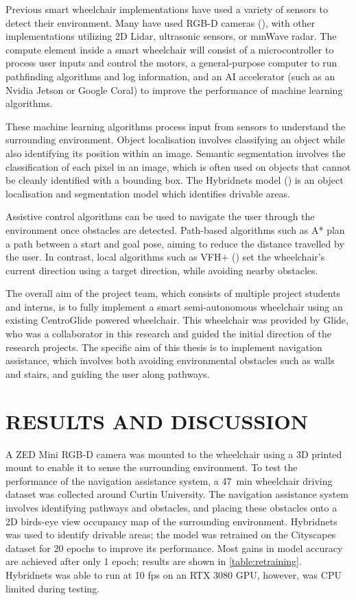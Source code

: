 \documentclass[10pt,twoside]{article}
\begin{document}
Previous smart wheelchair implementations have used a variety of sensors to detect their environment.
Many have used RGB-D cameras (\cite{wangS2P2SelfSupervisedGoalDirected2021}), with other implementations
utilizing 2D Lidar, ultrasonic sensors, or mmWave radar.
The compute element inside a smart wheelchair will consist of a microcontroller to process user inputs and control the motors,
a general-purpose computer to run pathfinding algorithms and log information, and an AI accelerator (such as an Nvidia Jetson or Google Coral)
to improve the performance of machine learning algorithms.

These machine learning algorithms process input from sensors to understand the surrounding environment.
Object localisation involves classifying an object while also identifying its position within an image.
Semantic segmentation involves the classification of each pixel in an image, which is often used
on objects that cannot be cleanly identified with a bounding box.
The Hybridnets model (\cite{vuHybridNetsEndtoEndPerception2022}) is an object localisation and
segmentation model which identifies drivable areas.

Assistive control algorithms can be used to navigate the user through the environment once obstacles are detected.
Path-based algorithms such as A*
plan a path between a start and goal pose, aiming to reduce the distance travelled by the user.
In contrast, local algorithms such as VFH+ (\cite{ulrichVFHReliableObstacle1998})
set the wheelchair's current direction using a target direction, while avoiding nearby obstacles.

The overall aim of the project team, which consists of multiple project students and interns,
is to fully implement a smart semi-autonomous wheelchair
using an existing CentroGlide powered wheelchair. This wheelchair was provided
by Glide, who was a collaborator in this research and guided the initial direction of the
research projects.
The specific aim of this thesis is to implement navigation assistance,
which involves both avoiding environmental obstacles such as walls and stairs,
and guiding the user along pathways.

\section*{\textbf{RESULTS AND DISCUSSION}} %
A ZED Mini RGB-D camera was mounted to the wheelchair using a 3D printed mount to enable it to
sense the surrounding environment. To test the performance of the navigation
assistance system, a \SI{47}{\minute} wheelchair driving dataset was collected around
Curtin University.
The navigation assistance system involves identifying pathways and obstacles,
and placing these obstacles onto a 2D birds-eye view occupancy map of the
surrounding environment. Hybridnets was used to identify drivable
areas; the model was retrained on the Cityscapes dataset for 20 epochs to improve its performance.
Most gains in model accuracy are achieved after only 1 epoch; results are shown in \cref{table:retraining}.
Hybridnets was able to run at 10 fps on an RTX 3080 GPU, however, was CPU limited during testing.
\end{document}
